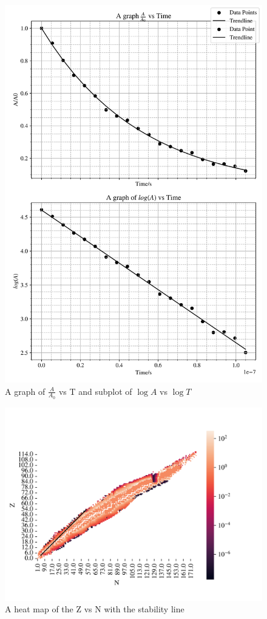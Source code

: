 \documentclass[12pt, a4paper]{article}
\begin{document}
\begin{figure}[H]
    \centering
    \includegraphics[width = \textwidth]{3Plot2.png}
    \caption{A graph of \(\frac{A}{A_0}\) vs T and subplot of \(\log{A}\) vs \(\log{T}\)}
    \label{fig:Fig 3.2}
\end{figure}

\begin{figure}[H]
    \centering
    \includegraphics[width = \textwidth]{3Plot3.png}
    \caption{A heat map of the Z vs N with the stability line}
    \label{fig:Fig 3.3}
\end{figure}
\end{document}
